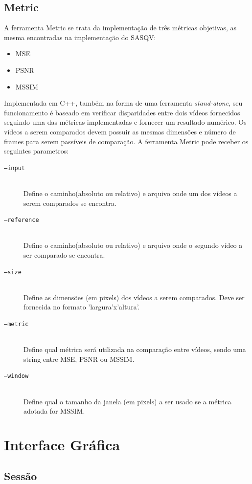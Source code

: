 \subsection{Metric}

A ferramenta Metric se trata da implementação de três métricas objetivas, as mesma encontradas na implementação do SASQV:

\begin{itemize}
	\item MSE
	\item PSNR
	\item MSSIM
\end{itemize}

Implementada em C++, também na forma de uma ferramenta \emph{stand-alone}, seu funcionamento é baseado em verificar disparidades entre dois vídeos fornecidos seguindo uma das métricas implementadas e fornecer um resultado numérico. 
Os vídeos a serem comparados devem possuir as mesmas dimensões e número de frames para serem passíveis de comparação. 
A ferramenta Metric pode receber os seguintes parametros:

\begin{description}
	\item[\texttt{--input}] \hfill \\
		Define o caminho(absoluto ou relativo) e arquivo onde um dos vídeos a serem comparados se encontra.
	\item[\texttt{--reference}] \hfill \\
		Define o caminho(absoluto ou relativo) e arquivo onde o segundo vídeo a ser comparado se encontra.
	\item[\texttt{--size}] \hfill \\
		Define as dimensões (em pixels) dos vídeos a serem comparados. Deve ser fornecida no formato 'largura'x'altura'.
	\item[\texttt{--metric}] \hfill \\
		Define qual métrica será utilizada na comparação entre vídeos, sendo uma string entre MSE, PSNR ou MSSIM.
	\item[\texttt{--window}] \hfill \\
		Define qual o tamanho da janela (em pixels) a ser usado se a métrica adotada for MSSIM.
\end{description}

\section{Interface Gráfica}
\subsection{Sessão}
